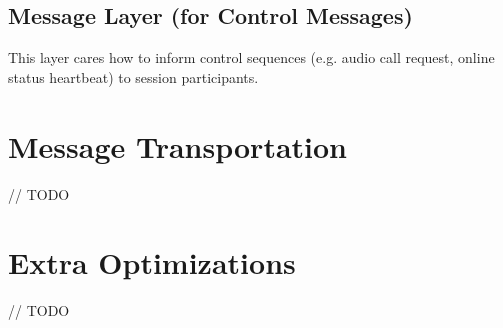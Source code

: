 \subsection{Message Layer (for Control Messages)}

This layer cares how to inform control sequences (e.g. audio call request, online status heartbeat) to session participants.








\section{Message Transportation}

// TODO










\section{Extra Optimizations}

// TODO












